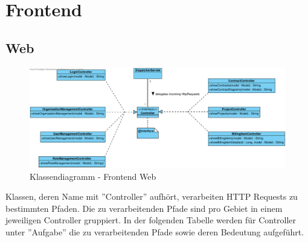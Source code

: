 
\section{Frontend}

\subsection{Web}

\begin{figure}[h]
	\centering
	\includegraphics[width=\linewidth]{img/diagrams/Frontend Classes.pdf}
	\caption{Klassendiagramm - Frontend Web}
	\label{fig:klassendiagramm-web}
\end{figure}

\noindent
Klassen, deren Name mit ''Controller'' aufhört, verarbeiten HTTP Requests zu bestimmten Pfaden.
Die zu verarbeitenden Pfade sind pro Gebiet in einem jeweiligen Controller gruppiert.
In der folgenden Tabelle werden für Controller unter ''Aufgabe'' die zu verarbeitenden Pfade sowie deren Bedeutung aufgeführt.

